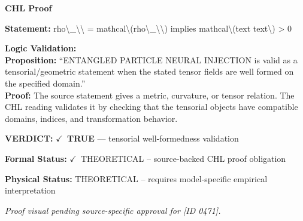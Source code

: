 \vspace{0.45em}
\noindent\textbf{CHL Proof}\par
\textbf{Statement:} rho\textbackslash{}\_\textbackslash{}\textbackslash{} = mathcal\textbackslash{}(rho\textbackslash{}\_\textbackslash{}\textbackslash{}) implies mathcal\textbackslash{}(text text\textbackslash{}) > 0

\textbf{Logic Validation:}\\
\textbf{Proposition:} ``ENTANGLED PARTICLE NEURAL INJECTION is valid as a tensorial/geometric statement when the
stated tensor fields are well formed on the specified domain.''\\
\textbf{Proof:} The source statement gives a metric, curvature, or tensor relation. The CHL reading
validates it by checking that the tensorial objects have compatible domains, indices,
and transformation behavior.

\textbf{VERDICT:} \ensuremath{\checkmark}\ \textbf{TRUE} --- tensorial well-formedness validation

\textbf{Formal Status:} \ensuremath{\checkmark}\ THEORETICAL -- source-backed CHL proof obligation

\textbf{Physical Status:} THEORETICAL -- requires model-specific empirical interpretation
\par\vspace{0.45em}
\par
\vfill
\begingroup\footnotesize\itshape
Proof visual pending source-specific approval for [ID 0471].
\par\endgroup
\vfill
\endgroup
\endgroup
